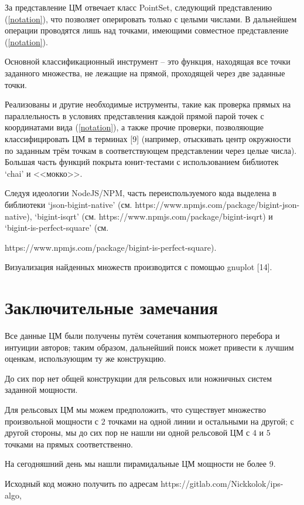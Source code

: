 \documentclass[12pt]{article}
\begin{document}
За представление ЦМ отвечает класс PointSet, следующий представлению (\ref{notation}), что позволяет оперировать только с целыми числами.
В дальнейшем операции проводятся лишь над точками, имеющими совместное представление (\ref{notation}).

Основной классификационный инструмент -- это функция, находящая все точки заданного множества, не лежащие на прямой, проходящей через две заданные точки.

Реализованы и другие необходимые иструменты, такие как проверка прямых на параллельность в условиях представления каждой прямой парой точек
с координатами вида (\ref{notation}), а также прочие проверки, позволяющие классифицировать ЦМ в терминах [9]
(например, отыскивать центр окружности по заданным трём точкам в соответствующем представлении через целые числа).
Большая часть функций покрыта юнит-тестами с использованием библиотек ‘chai’ и
<<мокко>>.

Следуя идеологии NodeJS/NPM, часть переиспользуемого кода выделена в библиотеки
‘json-bigint-native’ (см. https://www.npmjs.com/package/bigint-json-native), ‘bigint-isqrt’ (см. https://www.npmjs.com/package/bigint-isqrt)
и ‘bigint-is-perfect-square’ (см.

\noindent https://www.npmjs.com/package/bigint-is-perfect-square).

Визуализация найденных множеств производится с помощью gnuplot [14].


\section{Заключительные замечания}

Все данные ЦМ были получены путём сочетания компьютерного перебора и интуиции авторов;
таким образом, дальнейший поиск может привести к лучшим оценкам, использующим ту же
конструкцию.

До сих пор нет общей конструкции для рельсовых или ножничных систем заданной мощности.

Для рельсовых ЦМ мы можем предположить,
что существует множество произвольной мощности с $2$ точками на одной линии и остальными на другой;
с другой стороны,
мы до сих пор не нашли ни одной рельсовой ЦМ с $4$ и $5$ точками на прямых соответственно.

На сегодняшний день мы нашли пирамидальные ЦМ мощности не более $9$.

Исходный код можно получить по адресам https://gitlab.com/Nickkolok/ips-algo,
\end{document}
